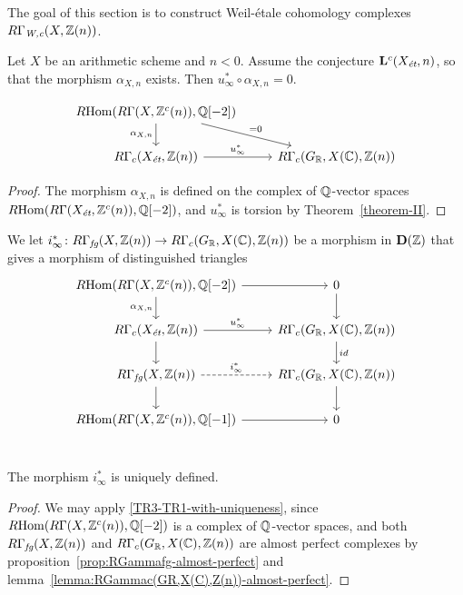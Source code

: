 \documentclass{article}
\numberwithin{equation}{section}
\begin{document}
The goal of this section is to construct Weil-étale cohomology complexes
$R\Gamma_\Wc (X, \ZZ(n))$.

\begin{lemma}
  Let $X$ be an arithmetic scheme and $n < 0$. Assume the conjecture
  $\mathbf{L}^c (X_\et, n)$, so that the morphism $\alpha_{X,n}$ exists.
  Then $u_\infty^* \circ \alpha_{X,n} = 0$.

  \[ \begin{tikzcd}
    \RHom (R\Gamma (X, \ZZ^c (n)), \QQ [-2]) \ar{d}[swap]{\alpha_{X,n}}\ar{dr}{= 0} \\
      R\Gamma_c (X_\et, \ZZ (n)) \ar{r}{u_\infty^*} & R\Gamma_c (G_\RR, X (\CC), \ZZ (n))
    \end{tikzcd} \]

  \begin{proof}
    The morphism $\alpha_{X,n}$ is defined on the complex of $\QQ$-vector spaces
    $\RHom (R\Gamma (X_\et, \ZZ^c (n)), \QQ [-2])$, and $u_\infty^*$ is torsion
    by Theorem~\ref{theorem-II}.
  \end{proof}
\end{lemma}

\begin{definition}
  \label{dfn:i-infty}
  We let
  $i_\infty^*\colon R\Gamma_\fg (X, \ZZ (n)) \to R\Gamma_c (G_\RR, X (\CC), \ZZ (n))$
  be a morphism in $\mathbf{D} (\ZZ)$ that gives a morphism of distinguished
  triangles
  \begin{equation}
    \label{eqn:triangle-defining-i-infty}
    \begin{tikzcd}
      \RHom (R\Gamma (X, \ZZ^c (n)), \QQ [-2]) \ar{d}[swap]{\alpha_{X,n}}\ar{r} & 0\ar{d} \\
      R\Gamma_c (X_\et, \ZZ (n)) \ar{r}{u_\infty^*}\ar{d} &  R\Gamma_c (G_\RR, X (\CC), \ZZ (n)) \ar{d}{id} \\
      R\Gamma_\fg (X, \ZZ (n)) \ar[dashed]{r}{i_\infty^*}\ar{d} & R\Gamma_c (G_\RR, X (\CC), \ZZ (n)) \ar{d} \\
      \RHom (R\Gamma (X, \ZZ^c (n)), \QQ [-1])\ar{r} & 0 \\
    \end{tikzcd}
  \end{equation}
\end{definition}

\begin{proposition}
  \label{prop:uniqueness-of-i-infty}
  The morphism $i_\infty^*$ is uniquely defined.

  \begin{proof}
    We may apply \ref{TR3-TR1-with-uniqueness}, since
    $\RHom (R\Gamma (X, \ZZ^c (n)), \QQ [-2])$ is a complex of $\QQ$-vector
    spaces, and both
    $R\Gamma_\fg (X, \ZZ (n))$ and
    $R\Gamma_c (G_\RR, X (\CC), \ZZ (n))$
    are almost perfect complexes by
    proposition~\ref{prop:RGammafg-almost-perfect} and
    lemma~\ref{lemma:RGammac(GR,X(C),Z(n))-almost-perfect}.
  \end{proof}
\end{proposition}
\end{document}

